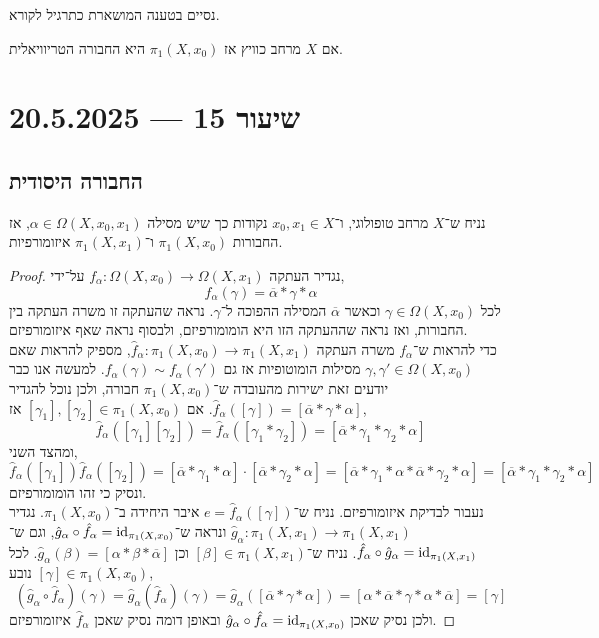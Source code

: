 נסיים בטענה המושארת כתרגיל לקורא.
\begin{proposition}
	אם $X$ מרחב כוויץ אז $\pi_1(X, x_0)$ היא החבורה הטריוויאלית.
\end{proposition}

\section{שיעור 15 --- 20.5.2025}
\subsection{החבורה היסודית}
\begin{proposition}
	נניח ש־$X$ מרחב טופולוגי, ו־$x_0, x_1 \in X$ נקודות כך שיש מסילה $\alpha \in \Omega(X, x_0, x_1)$,
	אז החבורות $\pi_1(X, x_0)$ ו־$\pi_1(X, x_1)$ איזומורפיות.
\end{proposition}
\begin{proof}
	נגדיר העתקה $f_{\alpha} : \Omega(X, x_0) \to \Omega(X, x_1)$ על־ידי,
	\[
		f_{\alpha}(\gamma)
		= \overline{\alpha} * \gamma * \alpha 
	\]
	לכל $\gamma \in \Omega(X, x_0)$ וכאשר $\overline{\alpha}$ המסילה ההפוכה ל־$\gamma$.
	נראה שהעתקה זו משרה העתקה בין החבורות, ואז נראה שההעתקה הזו היא הומומורפיזם, ולבסוף נראה שאף איזומורפיזם. \\
	כדי להראות ש־$f_{\alpha}$ משרה העתקה $\hat{f}_{\alpha} : \pi_1(X, x_0) \to \pi_1(X, x_1)$, מספיק להראות שאם $\gamma, \gamma' \in \Omega(X, x_0)$ מסילות הומוטופיות אז גם $f_{\alpha}(\gamma) \sim f_{\alpha}(\gamma')$.
	למעשה אנו כבר יודעים זאת ישירות מהעובדה ש־$\pi_1(X, x_0)$ חבורה, ולכן נוכל להגדיר $\hat{f}_{\alpha}([\gamma]) = [\overline{\alpha} * \gamma * \alpha]$.
	אם $[\gamma_1], [\gamma_2] \in \pi_1(X, x_0)$ אז,
	\[
		\hat{f}_{\alpha}([\gamma_1] [\gamma_2])
		= \hat{f}_{\alpha}([\gamma_1 * \gamma_2])
		= [\overline{\alpha} * \gamma_1 * \gamma_2 * \alpha]
	\]
	ומהצד השני,
	\[
		\hat{f}_{\alpha}([\gamma_1]) \hat{f}_{\alpha}([\gamma_2])
		= [\overline{\alpha} * \gamma_1 * \alpha] \cdot [ \overline{\alpha} * \gamma_2 * \alpha]
		= [\overline{\alpha} * \gamma_1 * \alpha * \overline{\alpha} * \gamma_2 * \alpha]
		= [\overline{\alpha} * \gamma_1 * \gamma_2 * \alpha] 
	\]
	ונסיק כי זהו הומומורפיזם. \\
	נעבור לבדיקת איזומורפיזם.
	נניח ש־$e = \hat{f}_{\alpha}([\gamma])$ איבר היחידה ב־$\pi_1(X, x_0)$.
	נגדיר $\hat{g}_{\alpha} : \pi_1(X, x_1) \to \pi_1(X, x_1)$ ונראה ש־$\hat{g}_{\alpha} \circ \hat{f}_{\alpha} = \operatorname{id}_{\pi_1(X, x_0)}$,
	וגם ש־$\hat{f}_{\alpha} \circ \hat{g}_{\alpha} = \operatorname{id}_{\pi_1(X, x_1)}$.
	נניח ש־$[\beta] \in \pi_1(X, x_1)$ וכן $\hat{g}_{\alpha}(\beta) = [\alpha * \beta * \overline{\alpha}]$.
	לכל $[\gamma] \in \pi_1(X, x_0)$ נובע,
	\[
		(\hat{g}_{\alpha} \circ \hat{f}_{\alpha})(\gamma)
		= \hat{g}_{\alpha}(\hat{f}_{\alpha})(\gamma)
		= \hat{g}_{\alpha}([\overline{\alpha} * \gamma * \alpha])
		= [\alpha * \overline{\alpha} * \gamma * \alpha * \overline{\alpha}]
		= [\gamma]
	\]
	ולכן נסיק שאכן $\hat{g}_{\alpha} \circ \hat{f}_{\alpha} = \operatorname{id}_{\pi_1(X, x_0)}$ ובאופן דומה נסיק שאכן $\hat{f}_{\alpha}$ איזומורפיזם.
\end{proof}
